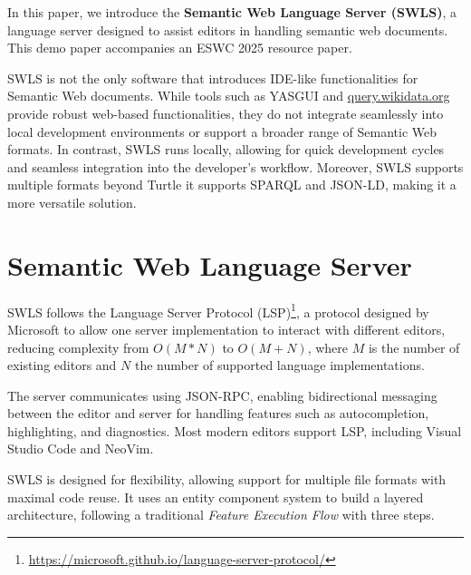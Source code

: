 In this paper, we introduce the \textbf{Semantic Web Language Server (SWLS)}, a language server designed to assist editors in handling semantic web documents.
This demo paper accompanies an ESWC 2025 resource paper.

SWLS is not the only software that introduces IDE-like functionalities for Semantic Web documents.
While tools such as YASGUI\cite{yasgui,10.1007/978-3-642-41242-4_7} and \href{https://query.wikidata.org/}{query.wikidata.org} provide robust web-based functionalities,
they do not integrate seamlessly into local development environments or support a broader range of Semantic Web formats.
In contrast, SWLS runs locally, allowing for quick development cycles and seamless integration into the developer's workflow. 
Moreover, SWLS supports multiple formats beyond Turtle it supports SPARQL and JSON-LD, making it a more versatile solution.

\section{Semantic Web Language Server}

SWLS follows the Language Server Protocol (LSP)\cite{IntroToLsp}\footnote{\url{https://microsoft.github.io/language-server-protocol/}},
a protocol designed by Microsoft to allow one server implementation to interact with different editors, reducing complexity from $O(M*N)$ to $O(M+N)$,
where $M$ is the number of existing editors and $N$ the number of supported language implementations.

The server communicates using JSON-RPC, enabling bidirectional messaging between the editor and server for handling features such as autocompletion, highlighting, and diagnostics.
Most modern editors support LSP, including Visual Studio Code and NeoVim.

SWLS is designed for flexibility, allowing support for multiple file formats with maximal code reuse. 
It uses an entity component system to build a layered architecture\cite{10.1145/3550355.3552452}, following a traditional \textit{Feature Execution Flow} with three steps.

